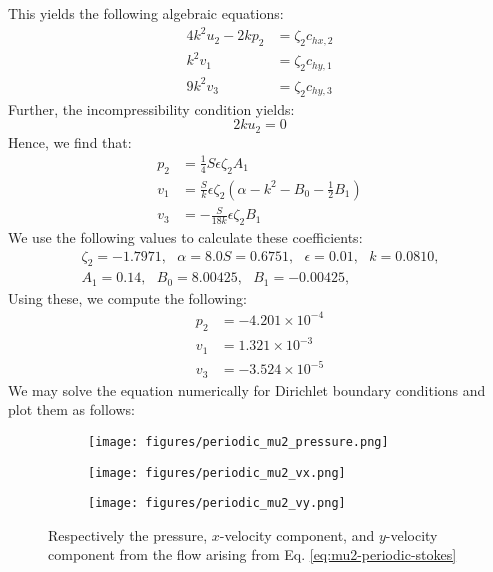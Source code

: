 \documentclass[reqno]{article}
\begin{document}
This yields the following algebraic equations:
\begin{align}
  4 k^2 u_2 - 2k p_2 &= \zeta_2 c_{hx, 2} \\
  k^2 v_1 &= \zeta_2 c_{hy, 1} \\
  9 k^2 v_3 &= \zeta_2 c_{hy, 3}
\end{align}
Further, the incompressibility condition yields:
\begin{equation}
  2k u_2 = 0
\end{equation}
Hence, we find that:
\begin{align}
  p_2 &= \tfrac14 S \epsilon \zeta_2 A_1 \\
  v_1 &= \tfrac{S}{k} \epsilon \zeta_2 (\alpha - k^2 - B_0 - \tfrac12 B_1)   \\
  v_3 &= -\tfrac{S}{18 k} \epsilon \zeta_2 B_1
\end{align}
We use the following values to calculate these coefficients:
\begin{equation}
  \begin{split}
    &\zeta_2 = -1.7971, \:\:\:
    \alpha = 8.0
    S = 0.6751, \:\:\:
    \epsilon = 0.01, \:\:\:
    k = 0.0810, \:\:\: \\
    &A_1 = 0.14, \:\:\:
    B_0 = 8.00425, \:\:\:
    B_1 = -0.00425, \:\:\:
  \end{split}
\end{equation}
Using these, we compute the following:
\begin{align}
  p_2 &= -4.201 \times 10^{-4} \\
  v_1 &= 1.321 \times 10^{-3} \\
  v_3 &= -3.524 \times 10^{-5}
\end{align}
We may solve the equation numerically for Dirichlet boundary conditions and plot
them as follows:
\begin{figure}[h] 
  \centering
  \begin{subfigure}{0.45\textwidth}
    \texttt{[image: figures/periodic\_mu2\_pressure.png]}
    \caption{}
    \label{fig:periodic-mu2-pressure}
  \end{subfigure}
  \hfill
  \begin{subfigure}{0.45\textwidth}
    \texttt{[image: figures/periodic\_mu2\_vx.png]}
    \caption{}
    \label{fig:periodic-mu2-vx}
  \end{subfigure}
  \begin{subfigure}{0.45\textwidth}
    \texttt{[image: figures/periodic\_mu2\_vy.png]}
    \caption{}
    \label{fig:periodic-mu2-vy}
  \end{subfigure}
  \caption{Respectively the pressure, $x$-velocity component, and $y$-velocity
    component from the flow arising from Eq. \eqref{eq:mu2-periodic-stokes}}
  \label{fig:periodic-mu2-plot}
\end{figure}
\end{document}
